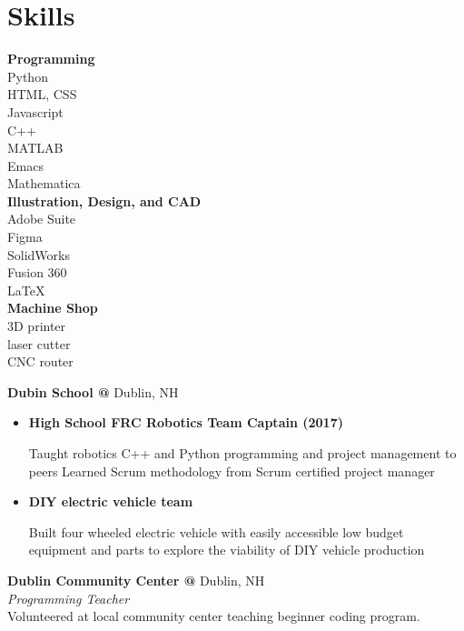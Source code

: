 \documentclass[10pt]{article} %
\begin{document}
\hspace{0.5cm}
\begin{minipage}[t]{0.2\textwidth}
 \section*{Skills}
\textbf{Programming}\\
Python\\
HTML, CSS\\
Javascript\\
C++\\
MATLAB\\
Emacs\\
Mathematica\\

\textbf{Illustration, Design, and CAD}\\
Adobe Suite\\
Figma\\
SolidWorks\\
Fusion 360\\
LaTeX\\
\textbf{Machine Shop}\\
3D printer\\ laser cutter\\ CNC router\\
\end{minipage}
\begin{minipage}[t]{0.8\textwidth}
  \textbf{Dubin School @} \space Dublin, NH\\
\begin{itemize} [noitemsep,topsep=0pt]
  \item {}\textbf{High School FRC Robotics Team Captain (2017)}

  Taught robotics C++ and Python programming and project management to peers Learned Scrum methodology from Scrum certified project manager
  \item {}\textbf{DIY electric vehicle team }

  Built four wheeled electric vehicle with easily accessible low budget equipment and parts to explore the viability of DIY vehicle production
  \\
\end{itemize}
\textbf{Dublin Community Center @} \space Dublin, NH \\
\textit{Programming Teacher}\\
Volunteered at local community center teaching beginner coding program.
\end{minipage}
\end{document}
